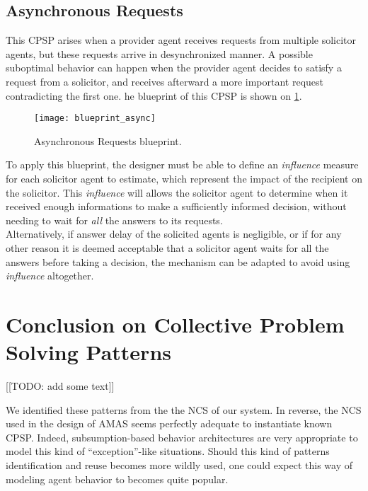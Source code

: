 \subsection{Asynchronous Requests}

This CPSP arises when a provider agent receives requests from multiple solicitor agents, but these requests arrive in desynchronized manner. A possible suboptimal behavior can happen when the provider agent decides to satisfy a request from a solicitor, and receives afterward a more important request contradicting the first one. he blueprint of this CPSP is shown on \figurename{} \ref{blueprint_async}.

\begin{figure}
\centering
\texttt{[image: blueprint\_async]}
\caption{Asynchronous Requests blueprint.}\label{blueprint_async}
\end{figure}

To apply this blueprint, the designer must be able to define an \emph{influence} measure for each solicitor agent to estimate, which represent the impact of the recipient on the solicitor. This \emph{influence} will allows the solicitor agent to determine when it received enough informations to make a sufficiently informed decision, without needing to wait for \emph{all} the answers to its requests.\\
Alternatively, if answer delay of the solicited agents is negligible, or if for any other reason it is deemed acceptable that a solicitor agent waits for all the answers before taking a decision, the mechanism can be adapted to avoid using \emph{influence} altogether.

\section{Conclusion on Collective Problem Solving Patterns}

[[TODO: add some text]]

We identified these patterns from the the NCS of our system. In reverse, the NCS used in the design of AMAS seems perfectly adequate to instantiate known CPSP. Indeed, subsumption-based behavior architectures are very appropriate to model this kind of \enquote{exception}-like situations. Should this kind of patterns identification and reuse becomes more wildly used, one could expect this way of modeling agent behavior to becomes quite popular.